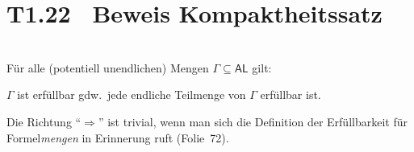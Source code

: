 \documentclass[fontsize=11pt, twoside=false, numbers=autoenddot]{scrbook}
\begin{document}
\section*{T1.22~ Beweis Kompaktheitssatz}

 \\
Für alle (potentiell unendlichen) Mengen $\Gamma \subseteq \textsf{AL}$ gilt:
\begin{center}
  $\Gamma$  ist erfüllbar gdw.\ jede endliche Teilmenge von $\Gamma$ erfüllbar ist.
\end{center}

\par\noindent
\begin{beweis}
  Die Richtung "`$\Rightarrow$"' ist trivial,
  wenn man sich die Definition der Erfüllbarkeit für Formel\emph{mengen} in Erinnerung ruft (Folie~72).


\end{beweis}
\end{document}
